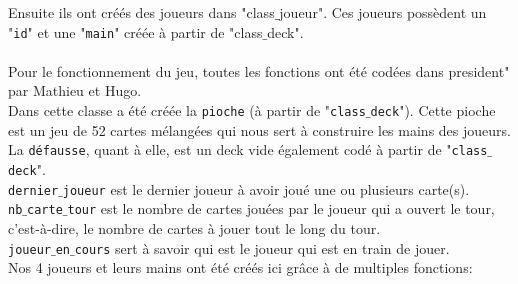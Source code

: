 \documentclass[french,12pt]{article}
\begin{document}
Ensuite ils ont créés des joueurs dans "\textsf{class$\_$joueur}". Ces joueurs possèdent un "\texttt{id}" et une "\texttt{main}" créée à partir de "\textsf{class$\_$deck}".
\\\\
Pour le fonctionnement du jeu, toutes les fonctions ont été codées dans \textsf{president}" par Mathieu et Hugo. \\
Dans cette classe a été créée la \texttt{pioche} (à partir de "\texttt{class$\_$deck}"). Cette pioche est un jeu de 52 cartes mélangées qui nous sert à construire les mains des joueurs.\\
La \texttt{défausse}, quant à elle, est un deck vide également codé à partir de "\texttt{class$\_$deck}".\\
\texttt{dernier$\_$joueur} est le dernier joueur à avoir joué une ou plusieurs carte(s).\\
\texttt{nb$\_$carte$\_$tour} est le nombre de cartes jouées par le joueur qui a ouvert le tour, c'est-à-dire, le nombre de cartes à jouer tout le long du tour.\\
\texttt{joueur$\_$en$\_$cours} sert à savoir qui est le joueur qui est en train de jouer.\\
Nos 4 joueurs et leurs mains ont été créés ici grâce à de multiples fonctions:\\
\end{document}
